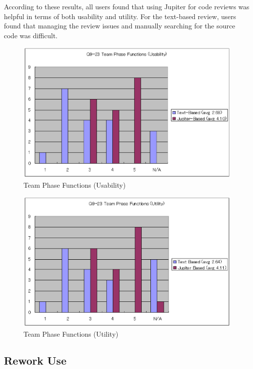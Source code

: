 According to these results, all users found that using Jupiter for code reviews was helpful in terms of both usability and utility. For the text-based review, users found that managing the review issues and manually searching for the source code was difficult.

\begin{figure}[htbp]
  \centering
  \includegraphics{images/fig5-11.eps}
  \caption{Team Phase Functions (Usability)}
  \label{fig5-11}
\end{figure}

\begin{figure}[htbp]
  \centering
  \includegraphics{images/fig5-12.eps}
  \caption{Team Phase Functions (Utility)}
  \label{fig5-12}
\end{figure}

\subsection{Rework Use}
\label{subsec:rework-use}

